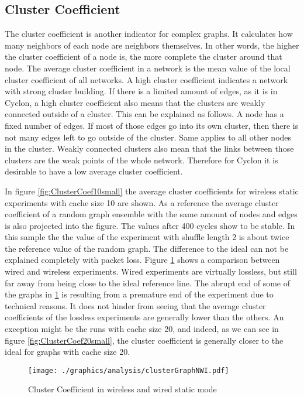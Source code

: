 \FloatBarrier
\subsection{Cluster Coefficient}
The cluster coefficient is another indicator for complex graphs. It
calculates how many neighbors of each node are neighbors themselves. In other
words, the higher the cluster coefficient of a node is, the more complete the
cluster around that node. The average cluster coefficient in a network is the
mean value of the local cluster coefficient of all networks. A high cluster
coefficient indicates a network with strong cluster building. If there is a
limited amount of edges, as it is in Cyclon, a high cluster coefficient also
means that the clusters are weakly connected outside of a cluster. This can be
explained as follows. A node has a fixed number of edges. If most of those edges
go into its own cluster, then there is not many edges left to go outside of the
cluster. Same applies to all other nodes in the cluster. Weakly connected
clusters also mean that the links between those clusters are the weak points of
the whole network. Therefore for Cyclon it is desirable to have a low
average cluster coefficient.

In figure \ref{fig:ClusterCoef10small} the average
cluster coefficients for wireless static experiments with cache size 10 are
shown. As a reference the average cluster coefficient of a random graph ensemble
with the same amount of nodes and edges is also projected into the figure. The
values after 400 cycles show to be stable. In this sample the the value of the
experiment with shuffle length 2 is about twice the reference value of the
random graph. The difference to the ideal can not be explained completely with
packet loss. Figure \ref{fig:ClusterCoefNWI} shows a comparison between
wired and wireless experiments. Wired experiments are virtually lossless, but
still far away from being close to the ideal reference line. The abrupt end
of some of the graphs in \ref{fig:ClusterCoefNWI} is resulting from a premature
end of the experiment due to technical reasons. It does not hinder from seeing
that the average cluster coefficients of the lossless experiments are generally
lower than the others. An exception might be the runs with cache size 20, and
indeed, as we can see in figure \ref{fig:ClusterCoef20small}, the cluster
coefficient is generally closer to the ideal for graphs with cache size 20.




\begin{figure}
	\centering
	\texttt{[image: ./graphics/analysis/clusterGraphNWI.pdf]}
	\caption{Cluster Coefficient in wireless and wired static mode}
	\label{fig:ClusterCoefNWI}
\end{figure}

